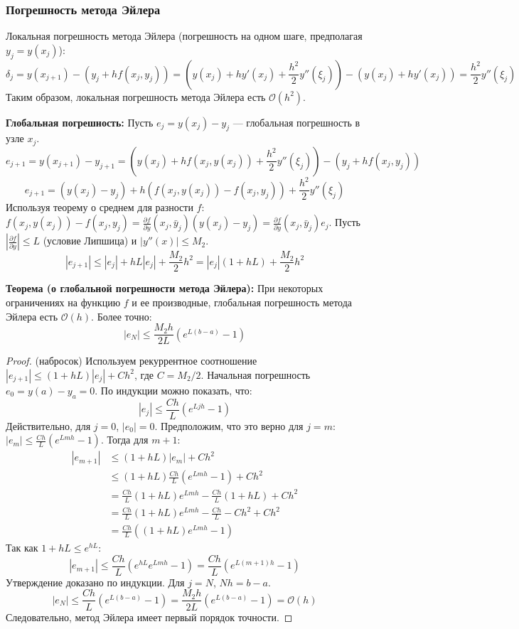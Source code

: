 \subsubsection{Погрешность метода Эйлера}
Локальная погрешность метода Эйлера (погрешность на одном шаге, предполагая $y_j=y(x_j)$):
\[ \delta_j = y(x_{j+1}) - (y_j + h f(x_j, y_j)) = \left( y(x_j) + h y'(x_j) + \frac{h^2}{2} y''(\xi_j) \right) - (y(x_j) + h y'(x_j)) = \frac{h^2}{2} y''(\xi_j) \]
Таким образом, локальная погрешность метода Эйлера есть $\mathcal{O}(h^2)$.

\textbf{Глобальная погрешность:}
Пусть $e_j = y(x_j) - y_j$ --- глобальная погрешность в узле $x_j$.
\[ e_{j+1} = y(x_{j+1}) - y_{j+1} = \left( y(x_j) + h f(x_j, y(x_j)) + \frac{h^2}{2} y''(\xi_j) \right) - (y_j + h f(x_j, y_j)) \]
\[ e_{j+1} = (y(x_j) - y_j) + h (f(x_j, y(x_j)) - f(x_j, y_j)) + \frac{h^2}{2} y''(\xi_j) \]
Используя теорему о среднем для разности $f$: $f(x_j, y(x_j)) - f(x_j, y_j) = \frac{\partial f}{\partial y}(x_j, \bar{y}_j) (y(x_j) - y_j) = \frac{\partial f}{\partial y}(x_j, \bar{y}_j) e_j$.
Пусть $\left|\frac{\partial f}{\partial y}\right| \le L$ (условие Липшица) и $|y''(x)| \le M_2$.
\[ |e_{j+1}| \le |e_j| + h L |e_j| + \frac{M_2}{2} h^2 = |e_j|(1+hL) + \frac{M_2}{2} h^2 \]

\textbf{Теорема (о глобальной погрешности метода Эйлера):}
При некоторых ограничениях на функцию $f$ и ее производные, глобальная погрешность метода Эйлера есть $\mathcal{O}(h)$. Более точно:
\[ |e_N| \le \frac{M_2 h}{2L} (e^{L(b-a)} - 1) \]

\begin{proof} (набросок)
Используем рекуррентное соотношение $|e_{j+1}| \le (1+hL)|e_j| + C h^2$, где $C = M_2/2$. Начальная погрешность $e_0 = y(a) - y_a = 0$.
По индукции можно показать, что:
\[ |e_j| \le \frac{C h}{L} (e^{Ljh} - 1) \]
Действительно, для $j=0$, $|e_0|=0$.
Предположим, что это верно для $j=m$: $|e_m| \le \frac{C h}{L} (e^{Lmh} - 1)$.
Тогда для $m+1$:
\begin{align*} |e_{m+1}| &\le (1+hL)|e_m| + C h^2 \\ &\le (1+hL) \frac{C h}{L} (e^{Lmh} - 1) + C h^2 \\ &= \frac{C h}{L} (1+hL)e^{Lmh} - \frac{C h}{L}(1+hL) + C h^2 \\ &= \frac{C h}{L} (1+hL)e^{Lmh} - \frac{C h}{L} - C h^2 + C h^2 \\ &= \frac{C h}{L} ((1+hL)e^{Lmh} - 1) \end{align*}
Так как $1+hL \le e^{hL}$:
\[ |e_{m+1}| \le \frac{C h}{L} (e^{hL}e^{Lmh} - 1) = \frac{C h}{L} (e^{L(m+1)h} - 1) \]
Утверждение доказано по индукции.
Для $j=N$, $Nh = b-a$.
\[ |e_N| \le \frac{C h}{L} (e^{L(b-a)} - 1) = \frac{M_2 h}{2L} (e^{L(b-a)} - 1) = \mathcal{O}(h) \]
Следовательно, метод Эйлера имеет первый порядок точности.
\end{proof}

